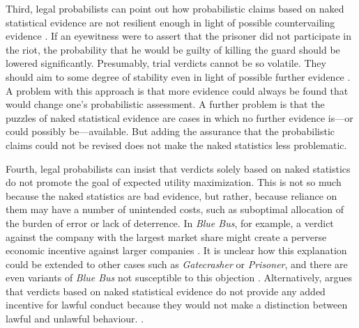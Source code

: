 \documentclass{article}
\begin{document}
 
 Third, legal probabilists can point out how probabilistic claims based on naked statistical evidence are not resilient enough in light of possible countervailing evidence \citep[on the notion of resilience and stability of belief, see][]{Skyrms1980, leitgeb2014}. 
  If an eyewitness were to assert that the prisoner did not participate in the riot, the probability that he would be guilty of killing the guard should be lowered significantly. Presumably, trial verdicts cannot be so volatile. They should aim to some degree of stability even in light of possible further evidence \citep{bolinger2020}.  
A problem with this approach is that more evidence could always be found that would change one's probabilistic assessment.
A further problem is that the puzzles of naked statistical evidence are cases in which no further evidence is---or could possibly be---available. But adding the assurance that the probabilistic claims could not be revised does not make the naked statistics less problematic. 
 
 
 Fourth, legal probabilists can insist that verdicts solely based on naked statistics do not promote the goal of expected utility maximization. This is not so much because the naked statistics are bad evidence, but rather, because reliance on them may have a number of unintended costs, such as suboptimal allocation of the burden of error or lack of deterrence. 
 In \textit{Blue Bus}, for example, a verdict against the company with the largest market share might create a perverse economic incentive against larger companies \citep{Posner1973}. It is unclear how this explanation could be extended to other cases such as \textit{Gatecrasher} or \textit{Prisoner}, and there are even variants of \emph{Blue Bus} not susceptible to this objection \citep{wells1992naked}. 
 Alternatively, \cite{dahlmanNakedStat2020} argues
 that verdicts based on naked statistical evidence do not provide any added incentive for lawful conduct because they would not make a distinction between lawful and unlawful behaviour.  \citep[On deterrence and naked statistics, see also][]{Enoch2012Statistical, enoch2015sense}. 
\end{document}
